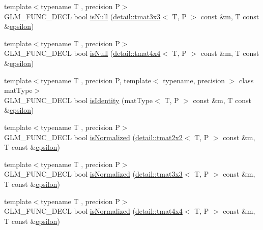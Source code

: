 \begin{DoxyCompactItemize}
\item 
{\footnotesize template$<$typename T , precision P$>$ }\\G\-L\-M\-\_\-\-F\-U\-N\-C\-\_\-\-D\-E\-C\-L bool \hyperlink{group__gtx__matrix__query_ga7a6ef9f174fec0224214ff5ba6c27ba4}{is\-Null} (\hyperlink{structglm_1_1detail_1_1tmat3x3}{detail\-::tmat3x3}$<$ T, P $>$ const \&m, T const \&\hyperlink{group__gtc__constants_gacb41049b8d22c8aa90e362b96c524feb}{epsilon})
\item 
{\footnotesize template$<$typename T , precision P$>$ }\\G\-L\-M\-\_\-\-F\-U\-N\-C\-\_\-\-D\-E\-C\-L bool \hyperlink{group__gtx__matrix__query_ga5b8d7b0c7bf1d48ff8df10321440a61a}{is\-Null} (\hyperlink{structglm_1_1detail_1_1tmat4x4}{detail\-::tmat4x4}$<$ T, P $>$ const \&m, T const \&\hyperlink{group__gtc__constants_gacb41049b8d22c8aa90e362b96c524feb}{epsilon})
\item 
{\footnotesize template$<$typename T , precision P, template$<$ typename, precision $>$ class mat\-Type$>$ }\\G\-L\-M\-\_\-\-F\-U\-N\-C\-\_\-\-D\-E\-C\-L bool \hyperlink{group__gtx__matrix__query_gafc1ce12c738b8c5d007179e615609330}{is\-Identity} (mat\-Type$<$ T, P $>$ const \&m, T const \&\hyperlink{group__gtc__constants_gacb41049b8d22c8aa90e362b96c524feb}{epsilon})
\item 
{\footnotesize template$<$typename T , precision P$>$ }\\G\-L\-M\-\_\-\-F\-U\-N\-C\-\_\-\-D\-E\-C\-L bool \hyperlink{group__gtx__matrix__query_gaae7339fac94c86ed741f20b6915682ab}{is\-Normalized} (\hyperlink{structglm_1_1detail_1_1tmat2x2}{detail\-::tmat2x2}$<$ T, P $>$ const \&m, T const \&\hyperlink{group__gtc__constants_gacb41049b8d22c8aa90e362b96c524feb}{epsilon})
\item 
{\footnotesize template$<$typename T , precision P$>$ }\\G\-L\-M\-\_\-\-F\-U\-N\-C\-\_\-\-D\-E\-C\-L bool \hyperlink{group__gtx__matrix__query_gab4c4106cd851951bad5e78a83bfc75dd}{is\-Normalized} (\hyperlink{structglm_1_1detail_1_1tmat3x3}{detail\-::tmat3x3}$<$ T, P $>$ const \&m, T const \&\hyperlink{group__gtc__constants_gacb41049b8d22c8aa90e362b96c524feb}{epsilon})
\item 
{\footnotesize template$<$typename T , precision P$>$ }\\G\-L\-M\-\_\-\-F\-U\-N\-C\-\_\-\-D\-E\-C\-L bool \hyperlink{group__gtx__matrix__query_gad0ff11cc2c26d3086d9f88316a321637}{is\-Normalized} (\hyperlink{structglm_1_1detail_1_1tmat4x4}{detail\-::tmat4x4}$<$ T, P $>$ const \&m, T const \&\hyperlink{group__gtc__constants_gacb41049b8d22c8aa90e362b96c524feb}{epsilon})

\end{DoxyCompactItemize}

